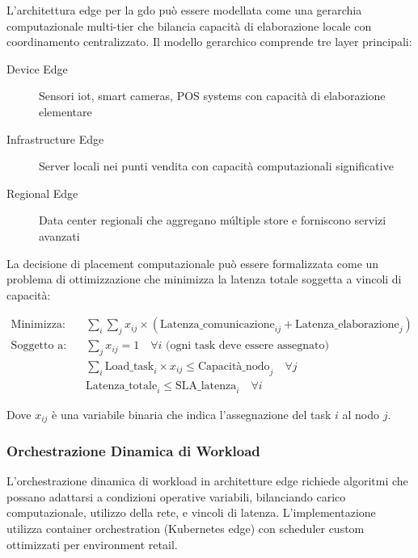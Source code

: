 L'architettura edge per la \gls{gdo} può essere modellata come una gerarchia computazionale multi-tier che bilancia capacità di elaborazione locale con coordinamento centralizzato. Il modello gerarchico comprende tre layer principali:

\begin{description}
    \item[Device Edge] Sensori \gls{iot}, smart cameras, POS systems con capacità di elaborazione elementare
    \item[Infrastructure Edge] Server locali nei punti vendita con capacità computazionali significative
    \item[Regional Edge] Data center regionali che aggregano múltiple store e forniscono servizi avanzati
\end{description}

La decisione di placement computazionale può essere formalizzata come un problema di ottimizzazione che minimizza la latenza totale soggetta a vincoli di capacità:

\begin{align}
\text{Minimizza:} \quad & \sum_{i} \sum_{j} x_{ij} \times (\text{Latenza\_comunicazione}_{ij} + \text{Latenza\_elaborazione}_j) \label{eq:placement-optimization} \\
\text{Soggetto a:} \quad & \sum_{j} x_{ij} = 1 \quad \forall i \text{ (ogni task deve essere assegnato)} \nonumber \\
& \sum_{i} \text{Load\_task}_i \times x_{ij} \leq \text{Capacità\_nodo}_j \quad \forall j \nonumber \\
& \text{Latenza\_totale}_i \leq \text{SLA\_latenza}_i \quad \forall i \nonumber
\end{align}

Dove $x_{ij}$ è una variabile binaria che indica l'assegnazione del task $i$ al nodo $j$.

\subsubsection{Orchestrazione Dinamica di Workload}

L'orchestrazione dinamica di workload in architetture edge richiede algoritmi che possano adattarsi a condizioni operative variabili, bilanciando carico computazionale, utilizzo della rete, e vincoli di latenza. L'implementazione utilizza container orchestration (Kubernetes edge) con scheduler custom ottimizzati per environment retail.

